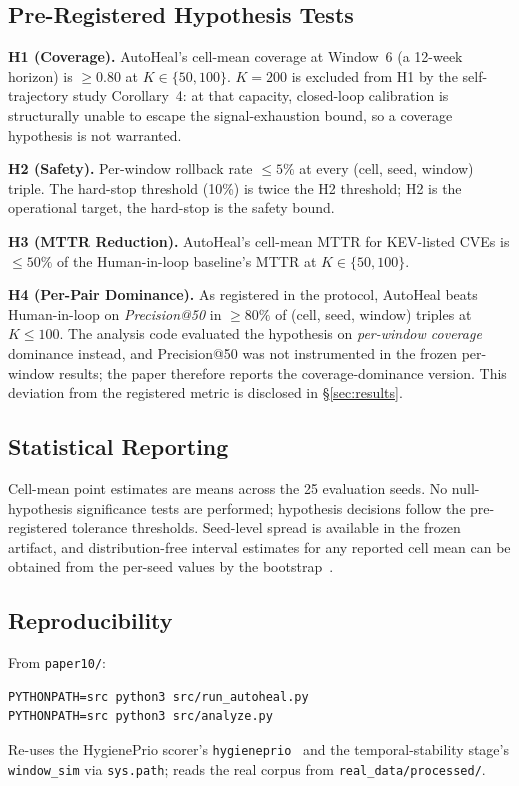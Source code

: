 \subsection{Pre-Registered Hypothesis Tests}

\textbf{H1 (Coverage).} AutoHeal's cell-mean coverage at Window~6
(a 12-week horizon) is $\geq 0.80$ at $K \in \{50, 100\}$.
$K = 200$ is excluded from H1 by the self-trajectory study Corollary~4: at that
capacity, closed-loop calibration is structurally unable to escape
the signal-exhaustion bound, so a coverage hypothesis is not
warranted.

\textbf{H2 (Safety).} Per-window rollback rate $\leq 5\%$ at every
(cell, seed, window) triple. The hard-stop threshold (10\%) is
twice the H2 threshold; H2 is the operational target, the hard-stop
is the safety bound.

\textbf{H3 (MTTR Reduction).} AutoHeal's cell-mean MTTR for KEV-listed
CVEs is $\leq 50\%$ of the Human-in-loop baseline's MTTR at
$K \in \{50, 100\}$.

\textbf{H4 (Per-Pair Dominance).} As registered in the protocol,
AutoHeal beats Human-in-loop on \emph{Precision@50} in
$\geq 80\%$ of (cell, seed, window) triples at $K \leq 100$. The
analysis code evaluated the hypothesis on \emph{per-window coverage}
dominance instead, and Precision@50 was not instrumented in the
frozen per-window results; the paper therefore reports the
coverage-dominance version. This deviation from the registered
metric is disclosed in \S\ref{sec:results}.

\subsection{Statistical Reporting}
\label{sec:stat_reporting}

Cell-mean point estimates are means across the 25 evaluation seeds.
No null-hypothesis significance tests are performed; hypothesis
decisions follow the pre-registered tolerance thresholds.
Seed-level spread is available in the frozen artifact, and
distribution-free interval estimates for any reported cell mean can
be obtained from the per-seed values by the bootstrap~\cite{diciccio1996bootstrap}.

\subsection{Reproducibility}

From \texttt{paper10/}:
{\small\begin{verbatim}
PYTHONPATH=src python3 src/run_autoheal.py
PYTHONPATH=src python3 src/analyze.py
\end{verbatim}}
Re-uses the HygienePrio scorer's \texttt{hygieneprio}~\cite{paper4hygieneprio} and
the temporal-stability stage's
\texttt{window\_sim} via \texttt{sys.path}; reads
the real corpus from \texttt{real\_data/processed/}.
